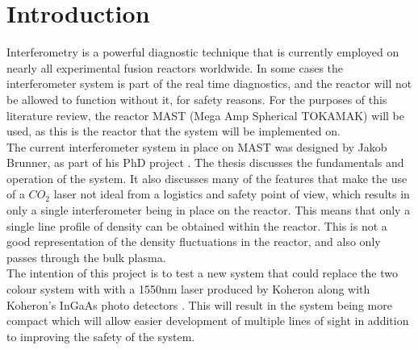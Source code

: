 \documentclass[12pt,a4paper,oneside]{report}
\begin{document}
\tableofcontents
\pagebreak
\clearpage
{}



\chapter{Introduction}
Interferometry is a powerful diagnostic technique that is currently employed on nearly all experimental fusion reactors worldwide. In some cases the interferometer system is part of the real time diagnostics, and the reactor will not be allowed to function without it, for safety reasons. For the purposes of this literature review, the reactor MAST (Mega Amp Spherical TOKAMAK) will be used, as this is the reactor that the system will be implemented on.\\
The current interferometer system in place on MAST was designed by Jakob Brunner, as part of his PhD project \cite{Brunner2017}. The thesis discusses the fundamentals and operation of the system. It also discusses many of the features that make the use of a $CO_{2}$ laser not ideal from a logistics and safety point of view, which results in only a single interferometer being in place on the reactor. This means that only a single line profile of density can be obtained within the reactor. This is not a good representation of the density fluctuations in the reactor, and also only passes through the bulk plasma.\\
The intention of this project is to test a new system that could replace the two colour system with with a 1550nm laser produced by Koheron \cite{KoheronLaserV1} along with Koheron's InGaAs photo detectors \cite{KoheronPD100Photodetector}. This will result in the system being more compact which will allow easier development of multiple lines of sight in addition to improving the safety of the system. %
\end{document}
